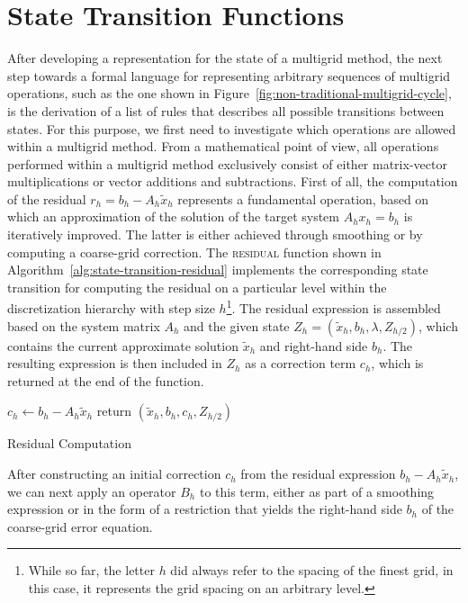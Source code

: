 \section{State Transition Functions}
\label{sec:multigrid-state-transitions}
After developing a representation for the state of a multigrid method, the next step towards a formal language for representing arbitrary sequences of multigrid operations,
such as the one shown in Figure~\ref{fig:non-traditional-multigrid-cycle}, is the derivation of a list of rules that describes all possible transitions between states.
For this purpose, we first need to investigate which operations are allowed within a multigrid method.
From a mathematical point of view, all operations performed within a multigrid method exclusively consist of either matrix-vector multiplications or vector additions and subtractions.
First of all, the computation of the residual $r_h = b_h - A_h \tilde{x}_h$ represents a fundamental operation, based on which an approximation of the solution of the target system $A_h x_h = b_h$ is iteratively improved.
The latter is either achieved through smoothing or by computing a coarse-grid correction.
The \textsc{residual} function shown in Algorithm~\ref{alg:state-transition-residual} implements the corresponding state transition for computing the residual on a particular level within the discretization hierarchy with step size $h$\footnote{While so far, the letter $h$ did always refer to the spacing of the finest grid, in this case, it represents the grid spacing on an arbitrary level.}.
The residual expression is assembled based on the system matrix $A_h$ and the given state $Z_h = (\tilde{x}_h, b_h, \lambda, Z_{h/2})$, which contains the current approximate solution $\tilde{x}_h$ and right-hand side $b_h$.
The resulting expression is then included in $Z_h$ as a correction term $c_h$, which is returned at the end of the function.
\begin{algorithm}
	\begin{algorithmic}
		\State $c_h \gets b_h - A_h \tilde{x}_h$
		\State return $(\tilde{x}_h, b_h, c_h, Z_{h/2})$
		\EndFunction
	\end{algorithmic}
\caption{Residual Computation}
\label{alg:state-transition-residual}
\end{algorithm}
After constructing an initial correction $c_h$ from the residual expression $b_h - A_h \tilde{x}_h$, we can next apply an operator $B_h$ to this term, either as part of a smoothing expression or in the form of a restriction that yields the right-hand side $b_h$ of the coarse-grid error equation.
